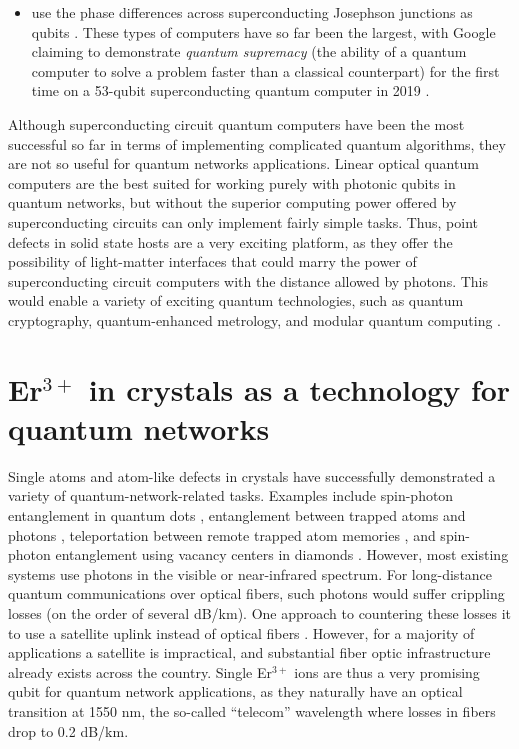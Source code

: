 \documentclass[12pt]{report}
\newcommand{\erbium}[1][ ]{Er$^{3+}$#1}
\begin{document}
\begin{itemize}
\item {} use the phase differences across superconducting Josephson junctions as qubits \cite{Nakamura1999}. These types of computers have so far been the largest, with Google claiming to demonstrate \emph{quantum supremacy} (the ability of a quantum computer to solve a problem faster than a classical counterpart) for the first time on a 53-qubit superconducting quantum computer in 2019 \cite{Arute2019}.
  
\end{itemize}

Although superconducting circuit quantum computers have been the most successful so far in terms of implementing complicated quantum algorithms, they are not so useful for quantum networks applications. Linear optical quantum computers are the best suited for working purely with photonic qubits in quantum networks, but without the superior computing power offered by superconducting circuits can only implement fairly simple tasks. Thus, point defects in solid state hosts are a very exciting platform, as they offer the possibility of light-matter interfaces that could marry the power of superconducting circuit computers with the distance allowed by photons. This would enable a variety of exciting quantum technologies, such as quantum cryptography, quantum-enhanced metrology, and modular quantum computing \cite{Monroe2014}.

\section{\erbium in crystals as a technology for quantum networks }
\label{sec:erbium-crystals-as}

Single atoms and atom-like defects in crystals have successfully demonstrated a variety of quantum-network-related tasks. Examples include spin-photon entanglement in quantum dots \cite{Greve2012}, entanglement between trapped atoms and photons \cite{Blinov2004}, teleportation between remote trapped atom memories \cite{Nolleke2013}, and spin-photon entanglement using vacancy centers in diamonds \cite{Togan2010}. However, most existing systems use photons in the visible or near-infrared spectrum. For long-distance quantum communications over optical fibers, such photons would suffer crippling losses (on the order of several dB/km). One approach to countering these losses it to use a satellite uplink instead of optical fibers \cite{Yin2017}. However, for a majority of applications a satellite is impractical, and substantial fiber optic infrastructure already exists across the country. Single \erbium ions are thus a very promising qubit for quantum network applications, as they naturally have an optical transition at 1550 nm, the so-called ``telecom'' wavelength where losses in fibers drop to 0.2 dB/km.
\end{document}
